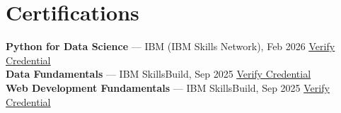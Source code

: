 \documentclass[letterpaper,10pt]{article}
\begin{document}
\section{Certifications}
  \begin{itemize}[leftmargin=0.1in, label={}]
    \small{\item{
      \textbf{Python for Data Science} — IBM (IBM Skills Network), Feb 2026 \hfill \href{https://www.credly.com/badges/6353235e-21c9-43c8-a3b6-466c7b84471f}{\underline{Verify Credential}} \\
      \textbf{Data Fundamentals} — IBM SkillsBuild, Sep 2025 \hfill \href{https://www.credly.com/badges/9224b96d-c231-4918-9b5c-6cb9aa886e77}{\underline{Verify Credential}} \\
      \textbf{Web Development Fundamentals} — IBM SkillsBuild, Sep 2025 \hfill \href{https://www.credly.com/badges/4acdd93c-2c4a-49b8-8c98-c423bc34999b}{\underline{Verify Credential}}
    }}
  \end{itemize}
\end{document}
